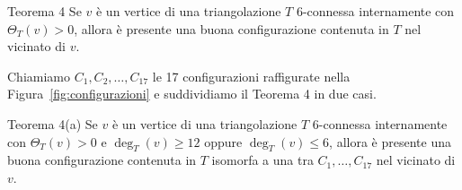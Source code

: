 \documentclass[a4paper,12pt,titlepage]{report}
\begin{document}
    \begin{namedthm*}{Teorema 4}
    	Se $v$ è un vertice di una triangolazione $T$ 6-connessa internamente con $\Theta_T(v) > 0$, allora è presente una buona configurazione contenuta in $T$ nel vicinato di $v$.
    \end{namedthm*}
    Chiamiamo $C_1, C_2, \dots, C_{17}$ le 17 configurazioni raffigurate nella Figura~\ref{fig:configurazioni} e suddividiamo il Teorema 4 in due casi.
    \begin{namedthm*}{Teorema 4(a)}
    	Se $v$ è un vertice di una triangolazione $T$ 6-connessa internamente con $\Theta_T(v) > 0$ e $\deg_T(v) \geq 12$ oppure $\deg_T(v) \leq 6$, allora è presente una buona configurazione contenuta in $T$ isomorfa a una tra $C_1, \dots, C_{17}$ nel vicinato di $v$. 
    \end{namedthm*}
\end{document}
